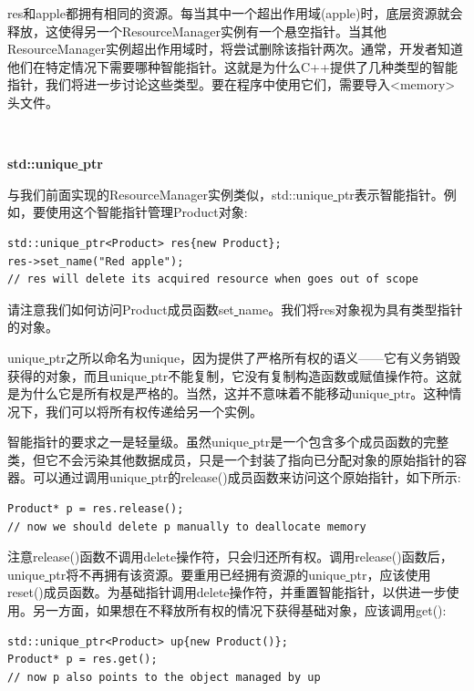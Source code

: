 res和apple都拥有相同的资源。每当其中一个超出作用域(apple)时，底层资源就会释放，这使得另一个ResourceManager实例有一个悬空指针。当其他ResourceManager实例超出作用域时，将尝试删除该指针两次。通常，开发者知道他们在特定情况下需要哪种智能指针。这就是为什么C++提供了几种类型的智能指针，我们将进一步讨论这些类型。要在程序中使用它们，需要导入<memory>头文件。\par

\noindent\textbf{}\ \par
\textbf{std::unique\underline{ }ptr} \ \par
与我们前面实现的ResourceManager实例类似，std::unique\underline{ }ptr表示智能指针。例如，要使用这个智能指针管理Product对象: \par

\begin{lstlisting}[caption={}]
std::unique_ptr<Product> res{new Product};
res->set_name("Red apple");
// res will delete its acquired resource when goes out of scope
\end{lstlisting}

请注意我们如何访问Product成员函数set\underline{ }name。我们将res对象视为具有类型指针的对象。\par
unique\underline{ }ptr之所以命名为unique，因为提供了严格所有权的语义——它有义务销毁获得的对象，而且unique\underline{ }ptr不能复制，它没有复制构造函数或赋值操作符。这就是为什么它是所有权是严格的。当然，这并不意味着不能移动unique\underline{ }ptr。这种情况下，我们可以将所有权传递给另一个实例。 \par
智能指针的要求之一是轻量级。虽然unique\underline{ }ptr是一个包含多个成员函数的完整类，但它不会污染其他数据成员，只是一个封装了指向已分配对象的原始指针的容器。可以通过调用unique\underline{ }ptr的release()成员函数来访问这个原始指针，如下所示: \par

\begin{lstlisting}[caption={}]
Product* p = res.release();
// now we should delete p manually to deallocate memory
\end{lstlisting}

注意release()函数不调用delete操作符，只会归还所有权。调用release()函数后，unique\underline{ }ptr将不再拥有该资源。要重用已经拥有资源的unique\underline{ }ptr，应该使用reset()成员函数。为基础指针调用delete操作符，并重置智能指针，以供进一步使用。另一方面，如果想在不释放所有权的情况下获得基础对象，应该调用get(): \par

\begin{lstlisting}[caption={}]
std::unique_ptr<Product> up{new Product()};
Product* p = res.get();
// now p also points to the object managed by up
\end{lstlisting}


